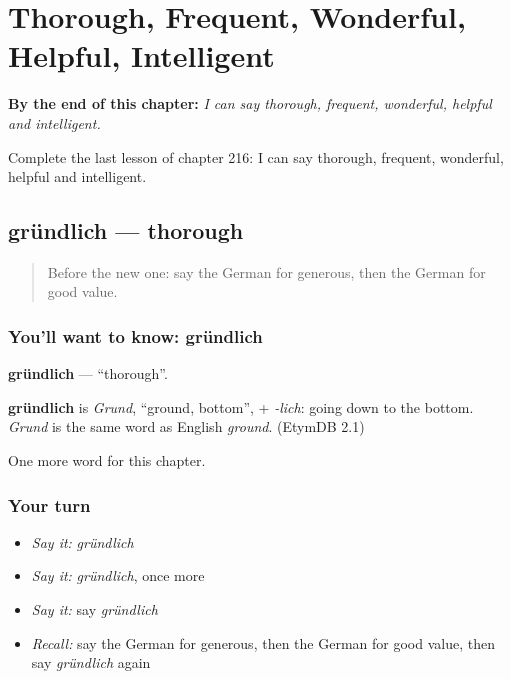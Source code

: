 
\chapter{Thorough, Frequent, Wonderful, Helpful, Intelligent}
\label{ch:ge-thorough-frequent-wonderful-helpful-intelligent}

\begin{chapteropening}
\textbf{By the end of this chapter:} \emph{I can say thorough, frequent, wonderful, helpful and intelligent.}

Complete the last lesson of chapter 216: I can say thorough, frequent, wonderful, helpful and intelligent.
\end{chapteropening}

\section[gründlich]{gründlich — thorough}

\label{lesson:GE-C216-gruendlich}



\begin{quote}
Before the new one: say the German for generous, then the German for good value.
\end{quote}

\subsection*{You'll want to know: gründlich}
\textbf{gründlich} — \textquotedblleft{}thorough\textquotedblright{}.

\begin{cousinweb}
\textbf{gründlich} is \emph{Grund}, \textquotedblleft{}ground, bottom\textquotedblright{}, + \emph{-lich}: going down to the bottom. \emph{Grund} is the same word as English \emph{ground}. (EtymDB 2.1)
\end{cousinweb}

\begin{grammarlens}[title={What you've built}]
One more word for this chapter.
\end{grammarlens}

\subsection*{Your turn}
\begin{itemize}
\raggedright
  \item \emph{Say it:} \emph{gründlich}
  \item \emph{Say it:} \emph{gründlich}, once more
  \item \emph{Say it:} say \emph{gründlich}
  \item \emph{Recall:} say the German for generous, then the German for good value, then say \emph{gründlich} again
\end{itemize}

